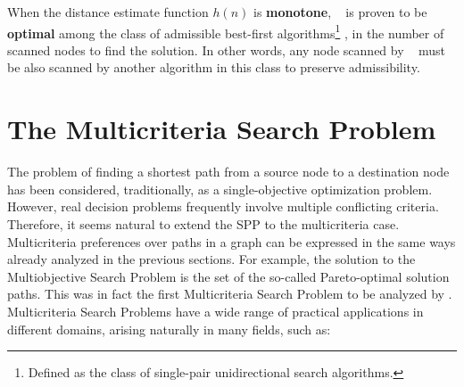 \begin{property}[Optimality]\label{chapMultiObjAlg:eq:singleObjOptimality}

When the distance estimate function $h(n)$ is \textbf{monotone}, 
\astar~ is  proven to be \textbf{optimal} among the class of admissible best-first algorithms\footnote{Defined as the class of single-pair unidirectional search algorithms.} \citep{Dechterpearl1985}, in the number of scanned nodes to find the solution. In other words, any node scanned by \astar~ must be also scanned by another algorithm in this class to preserve admissibility.
\end{property}
 
\section{The Multicriteria Search Problem}
\label{chapMultiObjAlg:sec:MSP}

The problem of finding a shortest path from a source node to a destination node has been considered, traditionally, as a single-objective optimization problem. However, real decision problems frequently involve multiple conflicting criteria. Therefore, it seems natural to extend the SPP to the multicriteria case. Multicriteria preferences over paths in a graph can be expressed in the same ways already analyzed in the previous sections. For example, the solution to the Multiobjective Search Problem is the set of the so-called Pareto-optimal solution paths. This was in fact the first Multicriteria Search Problem to be analyzed by \citet{hansen1979}. Multicriteria Search Problems have a wide range of practical applications in different domains, arising naturally in many fields, such as:

